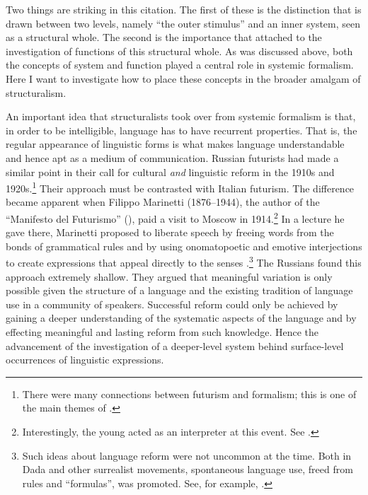 \documentclass[output=paper]{langscibook}
\begin{document}
Two things are striking in this citation. The first of these is the distinction that is drawn between two levels, namely ``the outer stimulus'' and an inner system, seen as a structural whole. The second is the importance that {\Jakobson} attached to the investigation of functions of this structural whole. As was discussed above, both the concepts of system and function played a central role in systemic formalism. Here I want to investigate how to place these concepts in the broader amalgam of structuralism.

An important idea that structuralists took over from systemic formalism is that, in order to be intelligible, language has to have recurrent properties. That is, the regular appearance of linguistic forms is what makes language understandable and hence apt as a medium of communication. Russian futurists had made a similar point in their call for cultural \emph{and} linguistic reform in the 1910s and 1920s.\footnote{There were many connections between futurism and formalism; this is one of the main themes of \citet{Toman1995}.} Their approach must be contrasted with Italian futurism. The difference became apparent when Filippo Marinetti (1876--1944), the author of the ``Manifesto del Futurismo'' (\citeyear{Marinetti1909}), paid a visit to Moscow in 1914.\footnote{Interestingly, the young {\Jakobson} acted as an interpreter at this event. See \citet[17]{Toman1995}.} In a lecture he gave there, Marinetti proposed to liberate speech by freeing words from the bonds of grammatical rules and by using onomatopoetic and emotive interjections to create expressions that appeal directly to the senses \citep[87--88]{Gasparov2014}.\footnote{Such ideas about language reform were not uncommon at the time. Both in Dada and other surrealist movements, spontaneous language use, freed from rules and ``formulas'', was promoted. See, for example, \citet{Spaendonck1977}.} The Russians found this approach extremely shallow. They argued that meaningful variation is only possible given the structure of a language and the existing tradition of language use in a community of speakers. Successful reform could only be achieved by gaining a deeper understanding of the systematic aspects of the language and by effecting meaningful and lasting reform from such knowledge. Hence the advancement of the investigation of a deeper-level system behind surface-level occurrences of linguistic expressions. 
\end{document}

